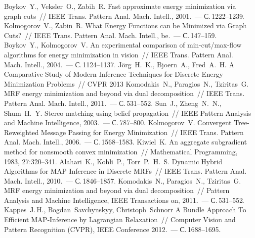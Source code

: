 \documentclass{article}
\begin{document}
\begin{thebibliography}{1}
    {Boykov~Y., Veksler~O., Zabih~R.}
    {Fast approximate energy minimization via graph cuts}~//
    {IEEE} Trans. Pattern Anal. Mach. Intell., 2001.~--- С.\,1222--1239.
    {Kolmogorov~V., Zabin~R.}
    {What Energy Functions can be Minimized via Graph Cuts?}~//
    {IEEE} Trans. Pattern Anal. Mach. Intell., be.~--- С.\,147--159.
    {Boykov~Y., Kolmogorov~V.}
    {An experimental comparison of min-cut/max-flow algorithms for energy minimization in vision}~//
    {IEEE} Trans. Pattern Anal. Mach. Intell., 2004.~--- С.\,1124--1137.
    {Jörg~H.~K., Bjoern~A., Fred~A.~H.}
    {A Comparative Study of Modern Inference Techniques for Discrete Energy Minimization Problems}~//
    CVPR 2013
    {Komodakis~N., Paragios~N., Tziritas~G.}
    {MRF energy minimization and beyond via dual decomposition}~//
    {IEEE} Trans. Pattern Anal. Mach. Intell., 2011.~--- С.\,531--552.
    {Sun~J., Zheng~N.~N., Shum~H.~Y.}
    {Stereo matching using belief propagation}~//
    {IEEE} Pattern Analysis and Machine Intelligence, 2003.~--- С.\,787--800.
    {Kolmogorov~V.}
    {Convergent Tree-Reweighted Message Passing for Energy Minimization}~//
    {IEEE} Trans. Pattern Anal. Mach. Intell., 2006.~--- С.\,1568--1583.
    {Kiwiel~K.}
    {An aggregate subgradient method for nonsmooth convex minimization}~//
    Mathematical Programming, 1983, 27:320--341.
    {Alahari~K., Kohli~P., Torr~P.~H.~S.}
    {Dynamic Hybrid Algorithms for MAP Inference in Discrete MRFs}~//
    {IEEE} Trans. Pattern Anal. Mach. Intell., 2010.~--- С.\,1846--1857.
    {Komodakis~N., Paragios~N., Tziritas~G.}
    {MRF energy minimization and beyond via dual decomposition}~//
    Pattern Analysis and Machine Intelligence, IEEE Transactions on, 2011.~--- С.\,531--552.
    {Kappes~J.\,H., Bogdan~Savchynskyy, Christoph~Schnorr}
    {A Bundle Approach To Efficient MAP-Inference by Lagrangian Relaxation}~//
    Computer Vision and Pattern Recognition (CVPR), IEEE Conference 2012.~--- С.\,1688--1695.
\end{thebibliography}
\end{document}
